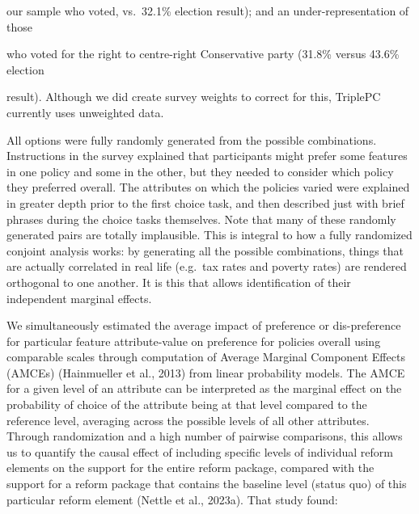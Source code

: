 \documentclass[
  letterpaper,
  DIV=11,
  numbers=noendperiod]{scrartcl}
\begin{document}
our sample who voted, vs.~32.1\% election result); and an
under-representation of those

who voted for the right to centre-right Conservative party (31.8\%
versus 43.6\% election

result). Although we did create survey weights to correct for this,
TriplePC currently uses unweighted data.

All options were fully randomly generated from the possible
combinations. Instructions in the survey explained that participants
might prefer some features in one policy and some in the other, but they
needed to consider which policy they preferred overall. The attributes
on which the policies varied were explained in greater depth prior to
the first choice task, and then described just with brief phrases during
the choice tasks themselves. Note that many of these randomly generated
pairs are totally implausible. This is integral to how a fully
randomized conjoint analysis works: by generating all the possible
combinations, things that are actually correlated in real life (e.g.~tax
rates and poverty rates) are rendered orthogonal to one another. It is
this that allows identification of their independent marginal effects.

We simultaneously estimated the average impact of preference or
dis-preference for particular feature attribute-value on preference for
policies overall using comparable scales through computation of Average
Marginal Component Effects (AMCEs) (Hainmueller et al., 2013) from
linear probability models. The AMCE for a given level of an attribute
can be interpreted as the marginal effect on the probability of choice
of the attribute being at that level compared to the reference level,
averaging across the possible levels of all other attributes. Through
randomization and a high number of pairwise comparisons, this allows us
to quantify the causal effect of including specific levels of individual
reform elements on the support for the entire reform package, compared
with the support for a reform package that contains the baseline level
(status quo) of this particular reform element (Nettle et al., 2023a).
That study found:
\end{document}

